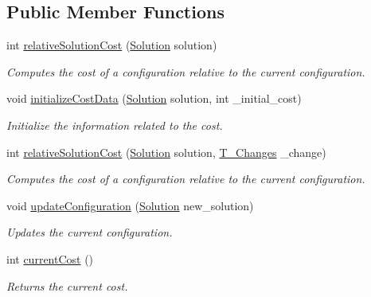 \subsection*{Public Member Functions}
\begin{DoxyCompactItemize}
\item 
int \hyperlink{interfacePOSL_1_1Benchmarks_1_1IRelativeCostStrategy_a6fe0080196e13becddbd8ff93612d9ac}{relative\+Solution\+Cost} (\hyperlink{classPOSL_1_1Data_1_1Solution}{Solution} solution)
\begin{DoxyCompactList}\small\item\em Computes the cost of a configuration relative to the current configuration. \end{DoxyCompactList}\item 
void \hyperlink{interfacePOSL_1_1Benchmarks_1_1IRelativeCostStrategy_a068a26820f0944ada9c38e30a4e4d593}{initialize\+Cost\+Data} (\hyperlink{classPOSL_1_1Data_1_1Solution}{Solution} solution, int \+\_\+initial\+\_\+cost)
\begin{DoxyCompactList}\small\item\em Initialize the information related to the cost. \end{DoxyCompactList}\item 
int \hyperlink{interfacePOSL_1_1Benchmarks_1_1IRelativeCostStrategy_a4582db712ef4cbb67b790459f7c441ac}{relative\+Solution\+Cost} (\hyperlink{classPOSL_1_1Data_1_1Solution}{Solution} solution, \hyperlink{structPOSL_1_1Tools_1_1T__Changes}{T\+\_\+\+Changes} \+\_\+change)
\begin{DoxyCompactList}\small\item\em Computes the cost of a configuration relative to the current configuration. \end{DoxyCompactList}\item 
void \hyperlink{interfacePOSL_1_1Benchmarks_1_1IRelativeCostStrategy_a74e16251c8b6304dec763e640e19f1df}{update\+Configuration} (\hyperlink{classPOSL_1_1Data_1_1Solution}{Solution} new\+\_\+solution)
\begin{DoxyCompactList}\small\item\em Updates the current configuration. \end{DoxyCompactList}\item 
int \hyperlink{interfacePOSL_1_1Benchmarks_1_1IRelativeCostStrategy_a98945d070a021b588b10f79ca3ea8f4b}{current\+Cost} ()
\begin{DoxyCompactList}\small\item\em Returns the current cost. \end{DoxyCompactList}\item 

\end{DoxyCompactItemize}
